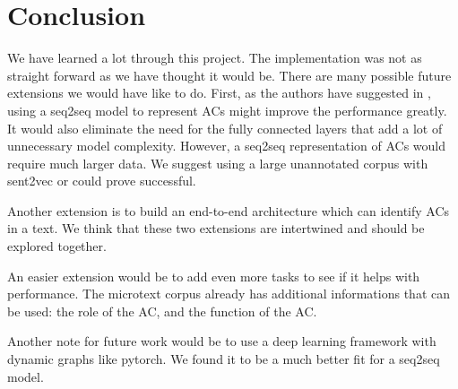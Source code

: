 \documentclass[onecolumn]{article}
\begin{document}
\section{Conclusion}
We have learned a lot through this project.
The implementation was not as straight forward as we have thought it would be.
There are many possible future extensions we would have like to do.
First, as the authors have suggested in \cite{potash2017here}, using a seq2seq model to represent ACs might improve the performance greatly.
It would also eliminate the need for the fully connected layers that add a lot of unnecessary model complexity.
However, a seq2seq representation of ACs would require much larger data.
We suggest using a large unannotated corpus with sent2vec or \cite{sent} could prove successful.

Another extension is to build an end-to-end architecture which can identify ACs in a text.
We think that these two extensions are intertwined and should be explored together.

An easier extension would be to add even more tasks to see if it helps with performance.
The microtext corpus already has additional informations that can be used: the role of the AC, and the function of the AC.

Another note for future work would be to use a deep learning framework with dynamic graphs like pytorch.
We found it to be a much better fit for a seq2seq model.

\nocite{*}


\end{document}
